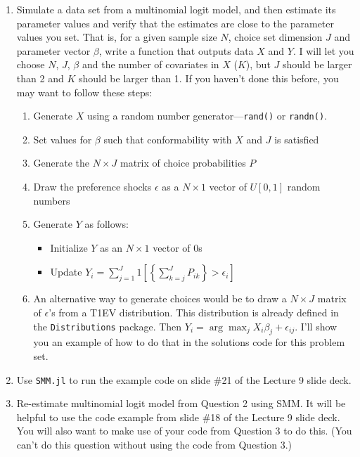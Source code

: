 \documentclass[12pt,english]{article}
\begin{document}
\begin{enumerate}
\item Simulate a data set from a multinomial logit model, and then estimate its parameter values and verify that the estimates are close to the parameter values you set. That is, for a given sample size $N$, choice set dimension $J$ and parameter vector $\beta$, write a function that outputs data $X$ and $Y$. I will let you choose $N$, $J$, $\beta$ and the number of covariates in $X$ ($K$), but $J$ should be larger than 2 and $K$ should be larger than 1. If you haven't done this before, you may want to follow these steps:
    \begin{enumerate}
    \item Generate $X$ using a random number generator---\texttt{rand()} or \texttt{randn()}.
    \item Set values for $\beta$ such that conformability with $X$ and $J$ is satisfied
    \item Generate the $N\times J$ matrix of choice probabilities $P$
    \item Draw the preference shocks $\epsilon$ as a $N\times 1$ vector of $U[0,1]$ random numbers
    \item Generate $Y$ as follows:
        \begin{itemize}
        \item Initialize $Y$ as an $N\times 1$ vector of 0s
        \item Update $Y_i = \sum_{j=1}^J 1\left[\left\{\sum_{k=j}^J  P_{ik}\right\} > 
        \epsilon_i\right]$
        \end{itemize}
    \item An alternative way to generate choices would be to draw a $N\times J$ matrix of $\epsilon$'s from a T1EV distribution. This distribution is already defined in the \texttt{Distributions} package. Then $Y_i = \arg \max_{j} X_i \beta_j + \epsilon_{ij}$. I'll show you an example of how to do that in the solutions code for this problem set.
    \end{enumerate}
\item Use \texttt{SMM.jl} to run the example code on slide \#21 of the Lecture 9 slide deck.

\item Re-estimate multinomial logit model from Question 2 using SMM. It will be helpful to use the code example from slide \#18 of the Lecture 9 slide deck. You will also want to make use of your code from Question 3 to do this. (You can't do this question without using the code from Question 3.)

\end{enumerate}
\end{document}
